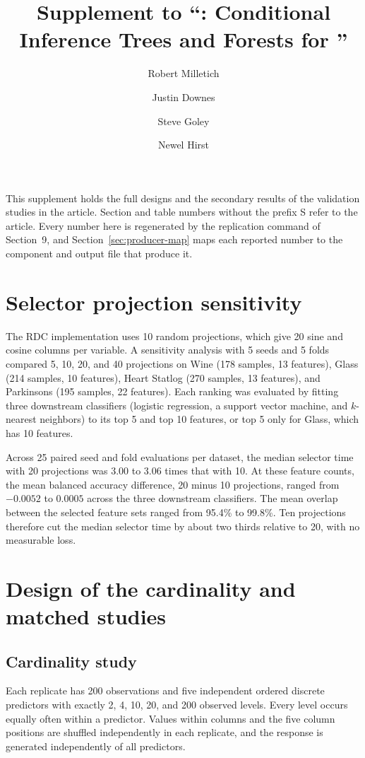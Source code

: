 \documentclass[11pt]{article}
\title{Supplement to ``\citrees: Conditional Inference Trees and Forests for
  \proglang{Python}''}
\author{Robert Milletich \and Justin Downes \and Steve Goley \and Newel Hirst}
\date{}
\begin{document}
\maketitle

This supplement holds the full designs and the secondary results of the
validation studies in the article. Section and table numbers without the
prefix S refer to the article. Every number here is regenerated by the
replication command of Section~9, and Section~\ref{sec:producer-map} maps each
reported number to the component and output file that produce it.

\section{Selector projection sensitivity} \label{sec:rdc-sensitivity}

The RDC implementation uses 10 random projections, which give 20 sine and
cosine columns per variable. A sensitivity analysis with 5 seeds and 5 folds
compared 5, 10, 20, and 40 projections on Wine (178 samples, 13 features),
Glass (214 samples, 10 features), Heart Statlog (270 samples, 13 features),
and Parkinsons (195 samples, 22 features). Each ranking was evaluated by
fitting three downstream classifiers (logistic regression, a support vector
machine, and $k$-nearest neighbors) to its top 5 and top 10 features, or top
5 only for Glass, which has 10 features.

Across 25 paired seed and fold evaluations per dataset, the median selector
time with 20 projections was 3.00 to 3.06 times that with 10. At these
feature counts, the mean balanced accuracy difference, 20 minus 10
projections, ranged from $-0.0052$ to $0.0005$ across the three downstream
classifiers. The mean overlap between the selected feature sets ranged from
95.4\% to 99.8\%. Ten projections therefore cut the median selector time by
about two thirds relative to 20, with no measurable loss.

\section{Design of the cardinality and matched studies} \label{sec:cardinality-design}

\subsection{Cardinality study}

Each replicate has 200 observations and five independent ordered discrete
predictors with exactly 2, 4, 10, 20, and 200 observed levels. Every level
occurs equally often within a predictor. Values within columns and the five
column positions are shuffled independently in each replicate, and the
response is generated independently of all predictors.
\end{document}
